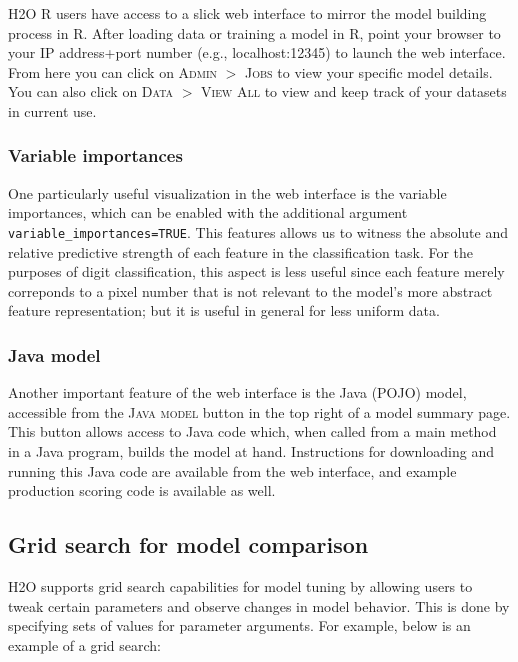 \documentclass[11pt]{article}
\begin{document}
H2O R users have access to a slick web interface to mirror the model building process in R. After loading data or training a model in R, point your browser to your IP address+port number (e.g., localhost:12345) to launch the web interface. From here you can click on \textsc{Admin} $>$ \textsc{Jobs} to view your specific model details. You can also click on \textsc{Data} $>$ \textsc{View All} to view and keep track of your datasets in current use. 

\subsubsection{Variable importances} \label{3.3.1}

One particularly useful visualization in the web interface is the variable importances, which can be enabled with the additional argument \texttt{variable\_importances=TRUE}. This features allows us to witness the absolute and relative predictive strength of each feature in the classification task. For the purposes of digit classification, this aspect is less useful since each feature merely correponds to a pixel number that is not relevant to the model's more abstract feature representation; but it is useful in general for less uniform data.

\subsubsection{Java model} \label{3.3.2}

Another important feature of the web interface is the Java (POJO) model, accessible from the \textsc{Java model} button in the top right of a model summary page. This button allows access to Java code which, when called from a main method in a Java program, builds the model at hand. Instructions for downloading and running this Java code are available from the web interface, and example production scoring  code is available as well.

\subsection{Grid search for model comparison} \label{3.4}

H2O supports grid search capabilities for model tuning by allowing users to tweak certain parameters and observe changes in model behavior. This is done by specifying sets of values for parameter arguments. For example, below is an example of a grid search:
\end{document}

